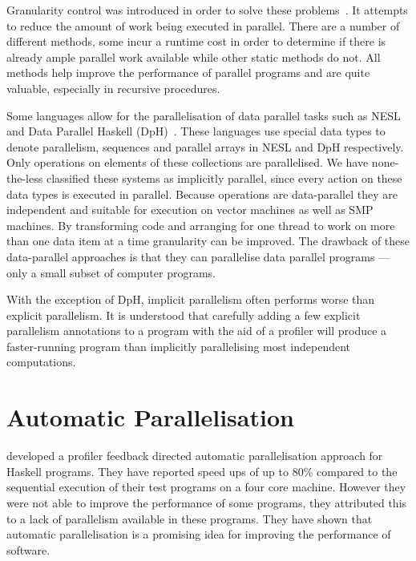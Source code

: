 Granularity control was introduced in order to solve these
problems~\citep{lopez96:distance_granularity,shen_98_granularity-control}.
It attempts to reduce the amount of work being executed in parallel.
There are a number of different methods, some incur a
runtime cost in order to determine if there is already ample parallel
work available while other static methods do not.
All methods help improve the performance of parallel programs and are
quite valuable, especially in recursive procedures.

Some languages allow for the parallelisation of data parallel
tasks such as NESL~\citep{blelloch:95:nesl} and Data Parallel
Haskell (DpH)~\citep{dph:2007:status_report,dph:2008:harnessing_the_multicores}.
These languages use special data types to denote parallelism,
sequences and parallel arrays in NESL and DpH respectively.
Only operations on elements of these collections are parallelised.
We have none-the-less classified these systems as implicitly parallel,
since every action on these data types is executed in parallel.
Because operations are data-parallel they are independent and suitable
for execution on vector machines as well as SMP machines.
By transforming code and arranging for one thread to work on more than
one data item at a time granularity can be improved.
The drawback of these data-parallel approaches is that they can
parallelise data parallel programs
--- only a small subset of computer programs.

With the exception of DpH, implicit parallelism often performs worse
than explicit parallelism.
It is understood that carefully adding a few explicit parallelism annotations
to a program with the aid of a profiler will produce a faster-running
program than implicitly parallelising most independent computations.

\section{Automatic Parallelisation}
\label{sec:intro_auto_par}

\citet{harris_07_feedback_imp_par} developed a profiler
feedback directed automatic parallelisation approach for Haskell programs.
They have reported speed ups of up to 80\% compared to the sequential
execution of their test programs on a four core machine.
However they were not able to improve the performance of some
programs, they attributed this to a lack of parallelism
available in these programs.
They have shown that automatic parallelisation is a promising idea for
improving the performance of software.


